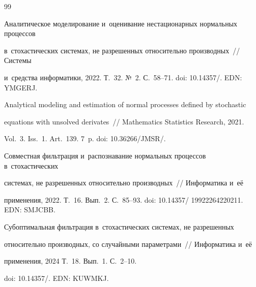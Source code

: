 {\small\frenchspacing

{%


\begin{thebibliography}{99}



Аналитическое моделирование и~оценивание нестационарных нормальных процессов 

в~стохастических сис\-те\-мах, не разрешенных относительно производных~/\!\!/ Системы 

и~средства информатики, 2022. Т.~32.  №~2. С.~58--71. doi: 10.14357\!/. EDN: YMGERJ.






Analytical modeling and estimation of normal processes defined by stochastic 

equations with unsolved derivates~/\!\!/ Mathematics Statistics Research, 2021. 

Vol.~3. Iss.~1. Art.~139. 7~p. doi: 10.36266\!/\!JMSR\!/.






Совместная фильтрация и~распознавание нормальных процессов в~стохастических 

системах, не разрешенных относительно производных~/\!\!/ Информатика и~её 

применения, 2022. Т.~16. Вып.~2. С.~85--93.  doi: 10.14357\!/ 19922264220211. EDN: SMJCBB.






Субоптимальная фильтрация в~стохастических системах, не разрешенных 

относительно производных, со случайными параметрами~/\!\!/ Информатика и~её 

применения, 2024  Т.~18. Вып.~1. С.~2--10.

doi: 10.14357\!/. EDN: KUWMKJ.






\end{thebibliography}}}
